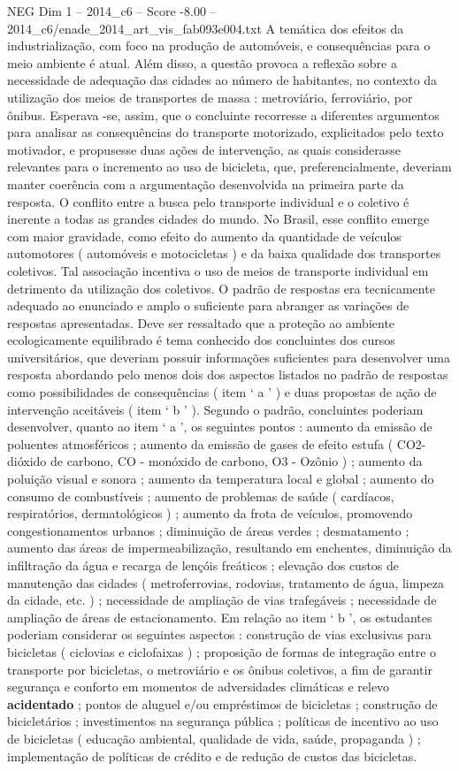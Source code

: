 \begin{textsample}{NEG Dim 1 – 2014\_c6 – Score -8.00 – 2014\_c6/enade\_2014\_art\_vis\_fab093e004.txt}
A temática dos efeitos da industrialização, com foco na produção de automóveis, e consequências para o meio ambiente é atual.
Além disso, a questão provoca a reflexão sobre a necessidade de adequação das cidades ao número de habitantes, no contexto da utilização dos meios de transportes de massa : metroviário, ferroviário, por ônibus.
Esperava -se, assim, que o concluinte recorresse a diferentes argumentos para analisar as consequências do transporte motorizado, explicitados pelo texto motivador, e propusesse duas ações de intervenção, as quais considerasse relevantes para o incremento ao uso de bicicleta, que, preferencialmente, deveriam manter coerência com a argumentação desenvolvida na primeira parte da resposta.
O conflito entre a busca pelo transporte individual e o coletivo é inerente a todas as grandes cidades do mundo.
No Brasil, esse conflito emerge com maior gravidade, como efeito do aumento da quantidade de veículos automotores ( automóveis e motocicletas ) e da baixa qualidade dos transportes coletivos.
Tal associação incentiva o uso de meios de transporte individual em detrimento da utilização dos coletivos.
O padrão de respostas era tecnicamente adequado ao enunciado e amplo o suficiente para abranger as variações de respostas apresentadas.
Deve ser ressaltado que a proteção ao ambiente ecologicamente equilibrado é tema conhecido dos concluintes dos cursos universitários, que deveriam possuir informações suficientes para desenvolver uma resposta abordando pelo menos dois dos aspectos listados no padrão de respostas como possibilidades de consequências ( item ‘ a ’ ) e duas propostas de ação de intervenção aceitáveis ( item ‘ b ’ ).
Segundo o padrão, concluintes poderiam desenvolver, quanto ao item ‘ a ’, os seguintes pontos : aumento da emissão de poluentes atmosféricos ; aumento da emissão de gases de efeito estufa ( CO2- dióxido de carbono, CO - monóxido de carbono, O3 - Ozônio ) ; aumento da poluição visual e sonora ; aumento da temperatura local e global ; aumento do consumo de combustíveis ; aumento de problemas de saúde ( cardíacos, respiratórios, dermatológicos ) ; aumento da frota de veículos, promovendo congestionamentos urbanos ; diminuição de áreas verdes ; desmatamento ; aumento das áreas de impermeabilização, resultando em enchentes, diminuição da infiltração da água e recarga de lençóis freáticos ; elevação dos custos de manutenção das cidades ( metroferrovias, rodovias, tratamento de água, limpeza da cidade, etc. ) ; necessidade de ampliação de vias trafegáveis ; necessidade de ampliação de áreas de estacionamento.
Em relação ao item ‘ b ’, os estudantes poderiam considerar os seguintes aspectos : construção de vias exclusivas para bicicletas ( ciclovias e ciclofaixas ) ; proposição de formas de integração entre o transporte por bicicletas, o metroviário e os ônibus coletivos, a fim de garantir segurança e conforto em momentos de adversidades climáticas e relevo \textbf{acidentado} ; pontos de aluguel e/ou empréstimos de bicicletas ; construção de bicicletários ; investimentos na segurança pública ; políticas de incentivo ao uso de bicicletas ( educação ambiental, qualidade de vida, saúde, propaganda ) ; implementação de políticas de crédito e de redução de custos das bicicletas.

\end{textsample}
